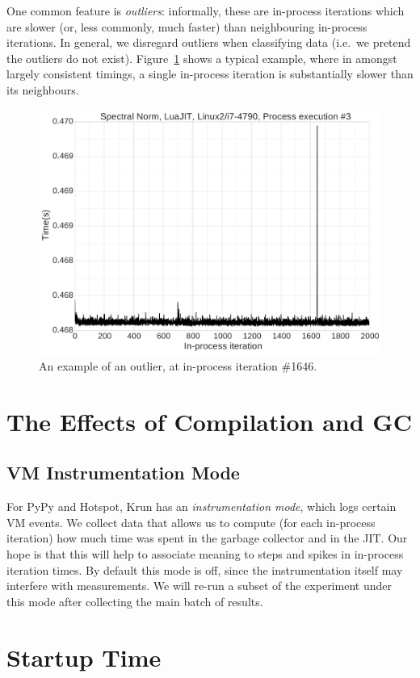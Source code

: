 \documentclass[preprint,numbers,10pt]{sigplanconf}
\newcommand{\krun}{Krun\xspace}
\begin{document}
One common feature is \emph{outliers}: informally, these are in-process
iterations which are slower (or, less commonly, much faster) than neighbouring
in-process iterations. In general, we disregard outliers when classifying data
(i.e.~we pretend the outliers do not exist).
Figure~\ref{fig:examples:outliers1} shows a typical example, where in amongst
largely consistent timings, a single in-process iteration is substantially
slower than its neighbours.


\begin{figure}[tbp]
\includegraphics[width=.475\textwidth]{examples/outliers1}
\caption{An example of an outlier, at in-process iteration \#1646.}
\label{fig:examples:outliers1}
\end{figure}


\section{The Effects of Compilation and GC}
\label{sec:deepdive}

\subsection{VM Instrumentation Mode}

For PyPy and Hotspot, \krun has an \emph{instrumentation mode}, which logs certain
VM events. We collect data that allows us to compute (for each in-process
iteration) how much time was spent in the garbage collector and in the JIT.
Our hope is that this will help to associate meaning to
steps and spikes in in-process iteration times. By default this mode is off,
since the instrumentation itself may interfere with measurements.
We will re-run a subset of the experiment under this mode after collecting the
main batch of results.


\section{Startup Time}
\label{sec:startup}
\end{document}

